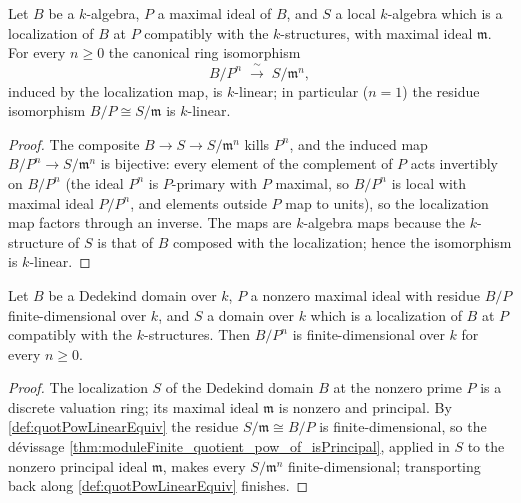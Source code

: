 \begin{definition}
  \label{def:quotPowLinearEquiv}
  \leanok
  Let \(B\) be a \(k\)-algebra, \(P\) a maximal ideal of \(B\), and \(S\) a local
  \(k\)-algebra which is a localization of \(B\) at \(P\) compatibly with the
  \(k\)-structures, with maximal ideal \(\mathfrak m\). For every \(n \ge 0\) the
  canonical ring isomorphism
  \[
    B/P^n \;\xrightarrow{\ \sim\ }\; S/\mathfrak m^n ,
  \]
  induced by the localization map, is \(k\)-linear; in particular (\(n = 1\)) the
  residue isomorphism \(B/P \cong S/\mathfrak m\) is \(k\)-linear.
\end{definition}
\begin{proof}
  \leanok
  The composite \(B \to S \to S/\mathfrak m^n\) kills \(P^n\), and the induced map
  \(B/P^n \to S/\mathfrak m^n\) is bijective: every element of the complement of \(P\)
  acts invertibly on \(B/P^n\) (the ideal \(P^n\) is \(P\)-primary with \(P\) maximal,
  so \(B/P^n\) is local with maximal ideal \(P/P^n\), and elements outside \(P\) map to
  units), so the localization map factors through an inverse. The maps are
  \(k\)-algebra maps because the \(k\)-structure of \(S\) is that of \(B\) composed
  with the localization; hence the isomorphism is \(k\)-linear.
\end{proof}

\begin{theorem}
  \label{thm:moduleFinite_quotient_pow_atPrime}
  \leanok
  Let \(B\) be a Dedekind domain over \(k\), \(P\) a nonzero maximal ideal with
  residue \(B/P\) finite-dimensional over \(k\), and \(S\) a domain over \(k\) which
  is a localization of \(B\) at \(P\) compatibly with the \(k\)-structures. Then
  \(B/P^n\) is finite-dimensional over \(k\) for every \(n \ge 0\).
\end{theorem}
\begin{proof}
  \leanok
  The localization \(S\) of the Dedekind domain \(B\) at the nonzero prime \(P\) is a
  discrete valuation ring; its maximal ideal \(\mathfrak m\) is nonzero and principal.
  By \ref{def:quotPowLinearEquiv} the residue \(S/\mathfrak m \cong B/P\) is
  finite-dimensional, so the d\'evissage
  \ref{thm:moduleFinite_quotient_pow_of_isPrincipal}, applied in \(S\) to the nonzero
  principal ideal \(\mathfrak m\), makes every \(S/\mathfrak m^n\) finite-dimensional;
  transporting back along \ref{def:quotPowLinearEquiv} finishes.
\end{proof}

